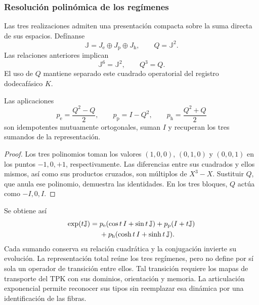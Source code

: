 \subsubsection{Resolución polinómica de los regímenes}

Las tres realizaciones admiten una presentación compacta sobre la suma
directa de sus espacios. Defínanse
\[
 \mathbb J=J_{\mathrm e}\oplus J_{\mathrm p}\oplus J_{\mathrm h},
 \qquad Q=\mathbb J^2.
\]
Las relaciones anteriores implican
\[
 \mathbb J^6=\mathbb J^2,\qquad Q^3=Q.
\]
El uso de \(Q\) mantiene separado este cuadrado operatorial del registro
dodecafásico \(K\).

\begin{proposition}
\label{euler-trit-proyectores}
Las aplicaciones
\[
 p_{\mathrm e}=\frac{Q^2-Q}{2},\qquad
 p_{\mathrm p}=I-Q^2,\qquad
 p_{\mathrm h}=\frac{Q^2+Q}{2}
\]
son idempotentes mutuamente ortogonales, suman \(I\) y recuperan los tres
sumandos de la representación.
\end{proposition}
\begin{proof}
Los tres polinomios toman los valores \((1,0,0)\), \((0,1,0)\) y
\((0,0,1)\) en los puntos \(-1,0,+1\), respectivamente. Las diferencias
entre sus cuadrados y ellos mismos, así como sus productos cruzados, son
múltiplos de \(X^3-X\). Sustituir \(Q\), que anula ese polinomio, demuestra
las identidades. En los tres bloques, \(Q\) actúa como \(-I,0,I\).
\end{proof}

Se obtiene así
\begin{align}
 \exp(t\mathbb J)
 ={}&p_{\mathrm e}(\cos t\,I+\sin t\,\mathbb J)
   +p_{\mathrm p}(I+t\mathbb J)\notag\\
   &+p_{\mathrm h}(\cosh t\,I+\sinh t\,\mathbb J).
 \label{euler-trit-exponencial-total}
\end{align}
Cada sumando conserva su relación cuadrática y la conjugación invierte
su evolución. La representación total reúne los tres regímenes, pero no
define por sí sola un operador de transición entre ellos. Tal transición
requiere los mapas de transporte del TPK con sus dominios, orientación y
memoria. La articulación exponencial permite reconocer sus tipos sin
reemplazar esa dinámica por una identificación de las fibras.
